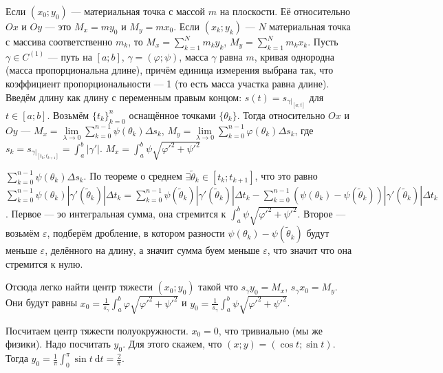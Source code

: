 \documentclass{article}
\begin{document}
    \begin{itemize}
        \dfn Если $(x_0;y_0)$ --- материальная точка с массой $m$ на плоскости. Её  относительно $Ox$ и $Oy$ --- это $M_x=my_0$ и $M_y=mx_0$.
        \dfn Если $(x_k;y_k)$ --- $N$ материальная точка с массива соответственно $m_k$, то $M_x=\sum\limits_{k=1}^Nm_ky_k$, $M_y=\sum\limits_{k=1}^Nm_kx_k$.
        \dfn Пусть $\gamma\in C^{(1)}$ --- путь на $[a;b]$, $\gamma=(\varphi;\psi)$, масса $\gamma$ равна $m$, кривая однородна (масса пропорциональна длине), причём единица измерения выбрана так, что коэффициент пропорциональности --- 1 (то есть масса участка равна длине). Введём длину как длину с переменным правым концом: $s(t)=s_{\gamma\big|_{[a;t]}}$ для $t\in[a;b]$. Возьмём $\{t_k\}_{k=0}^n$ оснащённое точками $\{\theta_k\}$. Тогда  относительно $Ox$ и $Oy$ --- $M_x=\lim\limits_{\lambda\to0}\sum\limits_{k=0}^{n-1}\psi(\theta_k)\Delta s_k$, $M_y=\lim\limits_{\lambda\to0}\sum\limits_{k=0}^{n-1}\varphi(\theta_k)\Delta s_k$, где $s_k=s_{\gamma\big|_{[t_k;t_{k+1}]}}=\int_a^b|\gamma'|$.
        \thm $M_x=\int_a^b\psi\sqrt{{\varphi'}^2+{\psi'}^2}$
        \begin{Proof}
            $\sum\limits_{k=0}^{n-1}\psi(\theta_k)\Delta s_k$. По теореме о среднем $\exists \widetilde\theta_k\in[t_k;t_{k+1}]$, что это равно $\sum\limits_{k=0}^{n-1}\psi(\theta_k)|\gamma'(\widetilde\theta_k)|\Delta t_k=\sum\limits_{k=0}^{n-1}\psi(\widetilde\theta_k)|\gamma'(\widetilde\theta_k)|\Delta t_k-\sum\limits_{k=0}^{n-1}(\psi(\theta_k)-\psi(\widetilde\theta_k))|\gamma'(\widetilde\theta_k)|\Delta t_k$. Первое --- эо интегральная сумма, она стремится к $\int_a^b\psi\sqrt{{\varphi'}^2+{\psi'}^2}$. Второе --- возьмём $\varepsilon$, подберём дробление, в котором разности $\psi(\theta_k)-\psi(\widetilde\theta_k)$ будут меньше $\varepsilon$, делённого на длину, а значит сумма буем меньше $\varepsilon$, что значит что она стремится к нулю.
        \end{Proof}
        \begin{Comment}
            Отсюда легко найти центр тяжести $(x_0;y_0)$ такой что $s_\gamma y_0=M_x$, $s_\gamma x_0=M_y$. Они будут равны $x_0=\frac1{s_\gamma}\int_a^b\varphi\sqrt{{\varphi'}^2+{\psi'}^2}$ и $y_0=\frac1{s_\gamma}\int_a^b\psi\sqrt{{\varphi'}^2+{\psi'}^2}$.
        \end{Comment}
        \begin{Example}
            Посчитаем центр тяжести полуокружности. $x_0=0$, что тривиально (мы же физики). Надо посчитать $y_0$. Для этого скажем, что $(x;y)=(\cos t;\sin t)$. Тогда $y_0=\frac1\pi\int_0^\pi\sin t~\mathrm dt=\frac2\pi$.
        \end{Example}
    \end{itemize}
\end{document}
